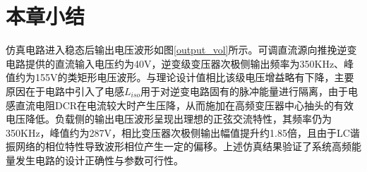\section{本章小结}
仿真电路进入稳态后输出电压波形如图\ref{output_vol}所示。可调直流源向推挽逆变电路提供的直流输入电压约为40V，逆变级变压器次极侧输出频率为350KHz、峰值约为155V的类矩形电压波形。与理论设计值相比该级电压增益略有下降，主要原因在于电路中引入了电感$L_{iso}$用于对逆变电路固有的脉冲能量进行隔离，由于电感直流电阻DCR在电流较大时产生压降，从而施加在高频变压器中心抽头的有效电压降低。负载侧的输出电压波形呈现出理想的正弦交流特性，其频率仍为350KHz，峰值约为287V，相比变压器次极侧输出幅值提升约1.85倍，且由于LC谐振网络的相位特性导致波形相位产生一定的偏移。上述仿真结果验证了系统高频能量发生电路的设计正确性与参数可行性。







